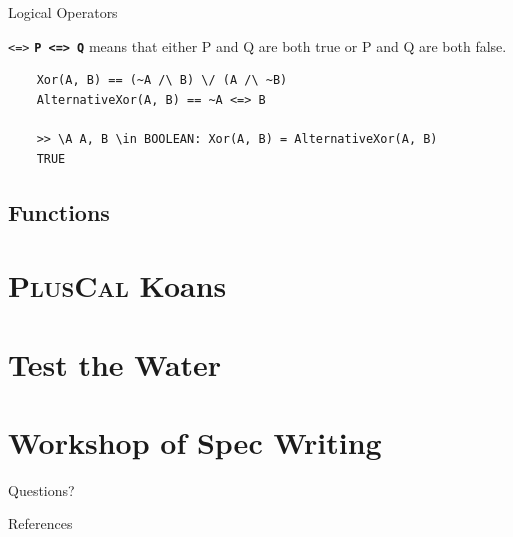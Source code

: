 \documentclass[10pt]{beamer}
\newcommand{\pluscal}{\textbf{\textsc{PlusCal}}\xspace}
\begin{document}
\begin{frame}{Logical Operators}
  \framebreak

  \begin{exampleblock}{\texttt{<=>}}
    \textbf{\texttt{P <=> Q}} means that either P and Q are both true or P and Q are both false. 
  \end{exampleblock}

  \begin{verbatim}
    Xor(A, B) == (~A /\ B) \/ (A /\ ~B)
    AlternativeXor(A, B) == ~A <=> B

    >> \A A, B \in BOOLEAN: Xor(A, B) = AlternativeXor(A, B)
    TRUE
  \end{verbatim}
    
\end{frame}


\subsection{Functions}


\section{\pluscal Koans}

\section{Test the Water}

\section{Workshop of Spec Writing}


\begin{frame}[standout]
  Questions?
\end{frame}

\appendix

\begin{frame}[allowframebreaks]{References}

  \nocite{*}
  
  

\end{frame}
\end{document}
